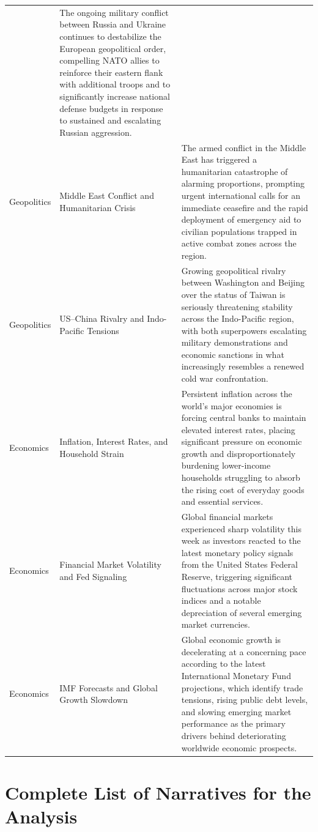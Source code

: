 \documentclass[
  journal=medium,
  manuscript=article-type,
  year=2025,
  volume=1,
]{cup-journal}
\begin{document}
\begin{longtable}{p{2cm}p{4cm}p{7cm}}
  & The ongoing military conflict between Russia and Ukraine continues to destabilize
    the European geopolitical order, compelling NATO allies to reinforce their eastern
    flank with additional troops and to significantly increase national defense budgets
    in response to sustained and escalating Russian aggression. \\
Geopolitics
  & Middle East Conflict and Humanitarian Crisis
  & The armed conflict in the Middle East has triggered a humanitarian catastrophe of
    alarming proportions, prompting urgent international calls for an immediate
    ceasefire and the rapid deployment of emergency aid to civilian populations trapped
    in active combat zones across the region. \\
Geopolitics
  & US--China Rivalry and Indo-Pacific Tensions
  & Growing geopolitical rivalry between Washington and Beijing over the status of
    Taiwan is seriously threatening stability across the Indo-Pacific region, with both
    superpowers escalating military demonstrations and economic sanctions in what
    increasingly resembles a renewed cold war confrontation. \\
\addlinespace
Economics
  & Inflation, Interest Rates, and Household Strain
  & Persistent inflation across the world's major economies is forcing central banks
    to maintain elevated interest rates, placing significant pressure on economic
    growth and disproportionately burdening lower-income households struggling to
    absorb the rising cost of everyday goods and essential services. \\
Economics
  & Financial Market Volatility and Fed Signaling
  & Global financial markets experienced sharp volatility this week as investors
    reacted to the latest monetary policy signals from the United States Federal
    Reserve, triggering significant fluctuations across major stock indices and a
    notable depreciation of several emerging market currencies. \\
Economics
  & IMF Forecasts and Global Growth Slowdown
  & Global economic growth is decelerating at a concerning pace according to the
    latest International Monetary Fund projections, which identify trade tensions,
    rising public debt levels, and slowing emerging market performance as the primary
    drivers behind deteriorating worldwide economic prospects. \\
\end{longtable}

\section{Complete List of Narratives for the Analysis}
\label{app:narratives}
\end{document}
